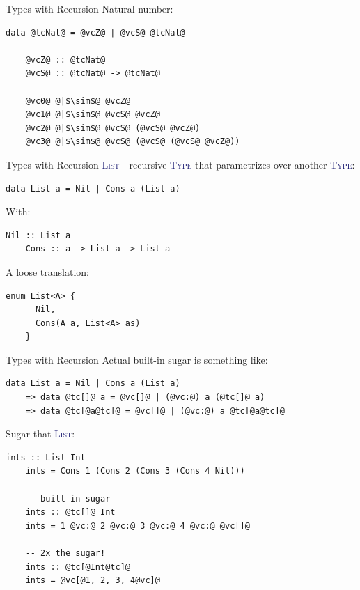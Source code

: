 \documentclass[xcolor={usenames,dvipsnames}]{beamer}
\newcommand{\htycon}[1]{\textcolor{MidnightBlue}{\textsc{#1}}}
\begin{document}
\begin{frame}[fragile]{Types with Recursion}
  Natural number:
  \begin{lstlisting}[style=hask]
    data @tcNat@ = @vcZ@ | @vcS@ @tcNat@

    @vcZ@ :: @tcNat@
    @vcS@ :: @tcNat@ -> @tcNat@

    @vc0@ @|$\sim$@ @vcZ@
    @vc1@ @|$\sim$@ @vcS@ @vcZ@
    @vc2@ @|$\sim$@ @vcS@ (@vcS@ @vcZ@)
    @vc3@ @|$\sim$@ @vcS@ (@vcS@ (@vcS@ @vcZ@))
  \end{lstlisting}
\end{frame}

\begin{frame}[fragile]{Types with Recursion}
  \htycon{List} - recursive \htycon{Type} that parametrizes over another \htycon{Type}:
  \begin{lstlisting}[style=hask]
    data List a = Nil | Cons a (List a)
  \end{lstlisting}

  With:
  \begin{lstlisting}[style=hask]
    Nil :: List a
    Cons :: a -> List a -> List a
  \end{lstlisting}

  \pause
  A loose translation:
  \begin{lstlisting}[style=hask]
    enum List<A> {
      Nil,
      Cons(A a, List<A> as)
    }
  \end{lstlisting}
\end{frame}

\begin{frame}[fragile]{Types with Recursion}
  Actual built-in sugar is something like:
  \begin{lstlisting}[style=hask]
       data List a = Nil | Cons a (List a)
    => data @tc[]@ a = @vc[]@ | (@vc:@) a (@tc[]@ a)
    => data @tc[@a@tc]@ = @vc[]@ | (@vc:@) a @tc[@a@tc]@
  \end{lstlisting}

  \pause
  Sugar that \htycon{List}:
  \begin{lstlisting}[style=hask]
    ints :: List Int 
    ints = Cons 1 (Cons 2 (Cons 3 (Cons 4 Nil)))

    -- built-in sugar
    ints :: @tc[]@ Int
    ints = 1 @vc:@ 2 @vc:@ 3 @vc:@ 4 @vc:@ @vc[]@

    -- 2x the sugar!
    ints :: @tc[@Int@tc]@
    ints = @vc[@1, 2, 3, 4@vc]@
  \end{lstlisting}
\end{frame}
\end{document}
